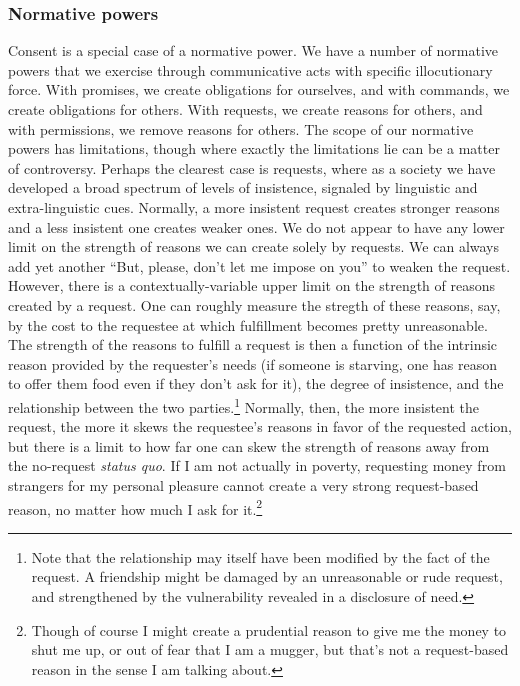 \subsubsection{Normative powers}
Consent is a special case of a normative power.
We have a number of normative powers that we exercise through communicative acts with specific illocutionary force.
With promises, we create obligations for ourselves, and with commands, we create obligations
for others. With requests, we create reasons for others, and with permissions, we remove reasons for others. 
The scope of our normative powers has limitations, though where exactly the limitations lie can be a matter of 
controversy. Perhaps the clearest case is requests, where as a society we have developed a broad spectrum of
levels of insistence, signaled by linguistic and extra-linguistic cues. Normally, a 
more insistent request creates stronger reasons and a less insistent one creates weaker ones. We do not appear
to have any lower limit on the strength of reasons we can create solely by requests. We can always add yet another
``But, please, don't let me impose on you'' to weaken the request. However, there is a contextually-variable
upper limit on the strength of reasons created by a request. One can roughly measure the stregth of these
reasons, say, by the cost to the requestee at which fulfillment becomes pretty unreasonable. The strength of
the reasons to fulfill a request is then a function of the intrinsic reason provided by the requester's needs
(if someone is starving, one has reason to offer them food even if they don't ask for it), the degree of
insistence, and the relationship between the two parties.\footnote{Note that the relationship may itself have been modified
by the fact of the request. A friendship might be damaged by an unreasonable or rude request, and strengthened by 
the vulnerability revealed in a disclosure of need.} Normally, then, the more insistent the request, the more it skews
the requestee's reasons in favor of the requested action, but there is a limit to how far one can skew the strength of
reasons away from the no-request \textit{status quo}. If I am not actually in poverty, requesting money from strangers
for my personal pleasure cannot create a very strong request-based reason, no matter how much I ask for it.\footnote{Though
of course I might create a prudential reason to give me the money to shut me up, or out of fear that I am a mugger, but
that's not a request-based reason in the sense I am talking about.}

